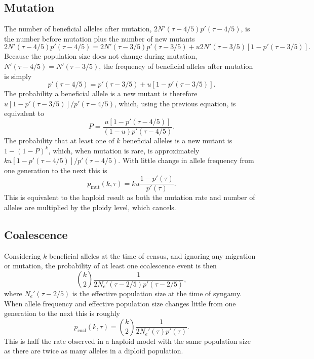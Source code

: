 \documentclass[]{article}
\begin{document}
\subsection*{Mutation}
%
The number of beneficial alleles after mutation, $2N'(\tau-4/5)p'(\tau-4/5)$, is the number before mutation plus the number of new mutants
\begin{equation}
2N'(\tau-4/5)p'(\tau-4/5) = 2N'(\tau-3/5)p'(\tau-3/5) + u 2N'(\tau-3/5)[1-p'(\tau-3/5)].
\end{equation}
Because the population size does not change during mutation, $N'(\tau-4/5)=N'(\tau-3/5)$, the frequency of beneficial alleles after mutation is simply
\begin{equation}
p'(\tau-4/5) = p'(\tau-3/5) + u [1-p'(\tau-3/5)].
\end{equation}
The probability a beneficial allele is a new mutant is therefore $u [1-p'(\tau-3/5)]/p'(\tau-4/5)$, which, using the previous equation, is equivalent to
\begin{equation}
P = \frac{u [1-p'(\tau-4/5)]}{(1-u)p'(\tau-4/5)}.
\end{equation}
The probability that at least one of $k$ beneficial alleles is a new mutant is $1-(1-P)^k$, which, when mutation is rare, is approximately $k u [1-p'(\tau-4/5)]/p'(\tau-4/5)$.
With little change in allele frequency from one generation to the next this is
\begin{equation}
p_\mathrm{mut}(k,\tau) = k u \frac{1-p'(\tau)}{p'(\tau)}.
\end{equation}
This is equivalent to the haploid result \citep[e.g., equation 5 in][]{pennings2006soft2} as both the mutation rate and number of alleles are multiplied by the ploidy level, which cancels.
%
\subsection*{Coalescence}
%
Considering $k$ beneficial alleles at the time of census, and ignoring any migration or mutation, the probability of at least one coalescence event is then 
\begin{equation}
\binom{k}{2}\frac{1}{2N_e'(\tau-2/5)p'(\tau-2/5)},
\end{equation}
where $N_e'(\tau-2/5)$ is the effective population size at the time of syngamy.
When allele frequency and effective population size changes little from one generation to the next this is roughly
\begin{equation}
p_\mathrm{coal}(k,\tau) = \binom{k}{2}\frac{1}{2N_e'(\tau)p'(\tau)}.
\end{equation}
This is half the rate observed in a haploid model with the same population size \citep[equation 5 in][]{pennings2006soft2} as there are twice as many alleles in a diploid population.
%
\end{document}
